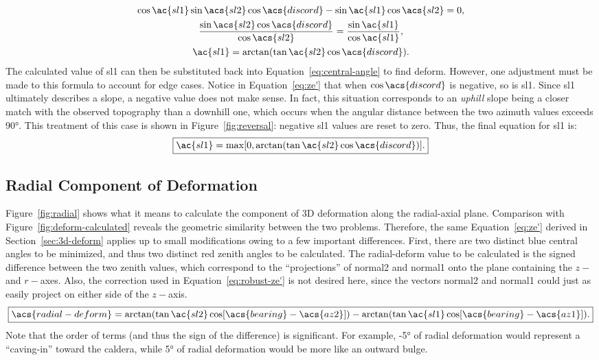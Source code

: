 \begin{gather}
    \cos\ac{sl1}\sin\acs{sl2}
    \cos\acs{discord}-\sin\ac{sl1}\cos\acs{sl2}
    =0,\nonumber\\
    \frac{\sin\acs{sl2}
    \cos\acs{discord}}
    {\cos\acs{sl2}}
    =\frac{\sin\ac{sl1}}{\cos\ac{sl1}},\nonumber\\
    \ac{sl1}
    =\arctan(\tan\ac{sl2}
    \cos\acs{discord}).
    \label{eq:ze'}
\end{gather}
The calculated value of \acs{sl1} can then be substituted back into Equation~\eqref{eq:central-angle} to find \acs{deform}. However, one adjustment must be made to this formula to account for edge cases. Notice in Equation~\eqref{eq:ze'} that when $\cos\acs{discord}$ is negative, so is \acs{sl1}. Since \acs{sl1} ultimately describes a slope, a negative value does not make sense. In fact, this situation corresponds to an \emph{uphill} slope being a closer match with the observed topography than a downhill one, which occurs when the angular distance between the two azimuth values exceeds \ang{90}. This treatment of this case is shown in Figure~\ref{fig:reversal}: negative \acs{sl1} values are reset to zero. Thus, the final equation for \acs{sl1} is:
\begin{equation}
    \boxed{\ac{sl1}
    =\max[0,\arctan(\tan\ac{sl2}
    \cos\acs{discord})].}
    \label{eq:robust-ze'}
\end{equation}

\subsection{Radial Component of Deformation}
Figure~\ref{fig:radial} shows what it means to calculate the component of 3D deformation along the radial-axial plane. Comparison with Figure~\ref{fig:deform-calculated} reveals the geometric similarity between the two problems. Therefore, the same Equation~\ref{eq:ze'} derived in Section~\ref{sec:3d-deform} applies up to small modifications owing to a few important differences. First, there are two distinct blue central angles to be minimized, and thus two distinct red zenith angles to be calculated. The \acf{radial-deform} value to be calculated is the signed difference between the two zenith values, which correspond to the ``projections'' of \acs{normal2} and \acs{normal1} onto the plane containing the $z-$ and $r-$axes. Also, the correction used in Equation~\eqref{eq:robust-ze'} is not desired here, since the vectors \acs{normal2} and \acs{normal1} could just as easily project on either side of the $z-$axis.
\begin{equation}
    \boxed{\acs{radial-deform}
    =\arctan(\tan\ac{sl2}
    \cos[\acs{bearing}-\acs{az2}])
    -\arctan(\tan\ac{sl1}
    \cos[\acs{bearing}-\acs{az1}]).}\label{eq:tilt-from-mapping}
\end{equation}
Note that the order of terms (and thus the sign of the difference) is significant. For example, \ang{-5} of radial deformation would represent a ``caving-in'' toward the caldera, while \ang{+5} of radial deformation would be more like an outward bulge.


